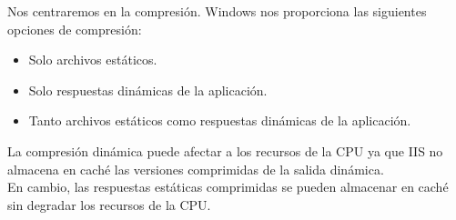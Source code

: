 	Nos centraremos en la compresión. Windows nos proporciona las siguientes opciones de compresión\cite{ejercicio5-3}:
	\begin{itemize}
		\item Solo archivos estáticos.
		\item Solo respuestas dinámicas de la aplicación.
		\item Tanto archivos estáticos como respuestas dinámicas de la aplicación.
	\end{itemize}
	
	La compresión dinámica puede afectar a los recursos de la CPU ya que IIS no almacena en caché las versiones comprimidas de la salida dinámica. \\
	En cambio, las respuestas estáticas comprimidas se pueden almacenar en caché sin degradar los recursos de la CPU.\\
	
